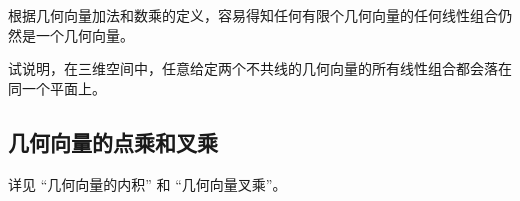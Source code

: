 根据几何向量加法和数乘的定义，容易得知任何有限个几何向量的任何线性组合仍然是一个几何向量。

\begin{exercise}{}
试说明，在三维空间中，任意给定两个不共线的几何向量的所有线性组合都会落在同一个平面上。
\end{exercise}

\subsection{几何向量的点乘和叉乘}
详见 “几何向量的内积” 和 “几何向量叉乘”。
